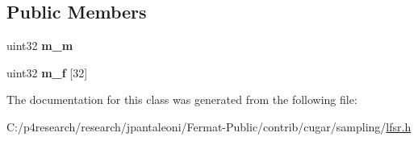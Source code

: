 \subsection*{Public Members}
\begin{DoxyCompactItemize}
\item 
\mbox{\label{classcugar_1_1_l_f_s_r_generator_matrix_a80ce08a8b13499ad66eb1733ee3d35d2}} 
uint32 {\bfseries m\+\_\+m}
\item 
\mbox{\label{classcugar_1_1_l_f_s_r_generator_matrix_a007507bbdc265c1f3e4042d2bc7005cf}} 
uint32 {\bfseries m\+\_\+f} \mbox{[}32\mbox{]}
\end{DoxyCompactItemize}


The documentation for this class was generated from the following file\+:\begin{DoxyCompactItemize}
\item 
C\+:/p4research/research/jpantaleoni/\+Fermat-\/\+Public/contrib/cugar/sampling/\hyperlink{lfsr_8h}{lfsr.\+h}\end{DoxyCompactItemize}
